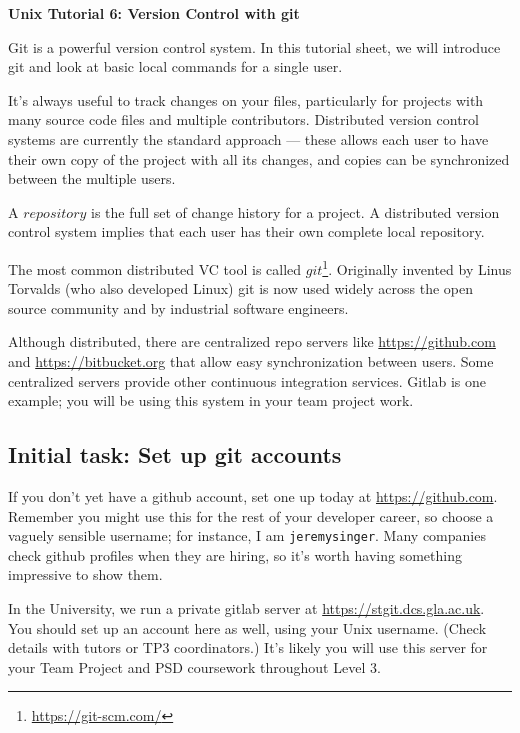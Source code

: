 \documentclass{article}
\begin{document}
\noindent
{\Large \textsf{\textbf{Unix Tutorial 6: Version Control with git}}}

\bigskip

Git is a powerful version control system. In this tutorial sheet, we will
introduce git and look at basic local commands for a single user.

It's always useful to track changes on your files, particularly for
projects with many source code files and multiple contributors.
Distributed version control systems are currently the standard
approach --- these allows each user to have their own copy of the
project with all its changes, and copies can be synchronized between
the multiple users.

A $repository$ is the full set of change history for a project.
A distributed version control system implies that
each user has their own complete local repository.

The most common distributed VC tool is called $git$\footnote{\url{https://git-scm.com/}}. Originally invented
by Linus Torvalds (who also developed Linux) git is now used widely
across the open source community and by industrial software engineers.

Although distributed, there are centralized repo servers like \url{https://github.com} and \url{https://bitbucket.org} that
allow easy synchronization between users. Some centralized servers
provide other continuous integration services. Gitlab is one example;
you will be using this system in your team project work.

\subsection*{Initial task: Set up git accounts}

If you don't yet have a github account, set one up today at \url{https://github.com}. Remember you might use this for the rest of your developer career, so choose a vaguely sensible username; for instance, I am \texttt{jeremysinger}. Many companies check github profiles when they are hiring, so it's worth having something impressive to show them.

In the University, we run a private gitlab server at \url{https://stgit.dcs.gla.ac.uk}. You should set up an account here as well, using your Unix username. (Check details with tutors or TP3 coordinators.) It's likely you will use this server for your Team Project and PSD coursework
throughout Level 3.
\end{document}
